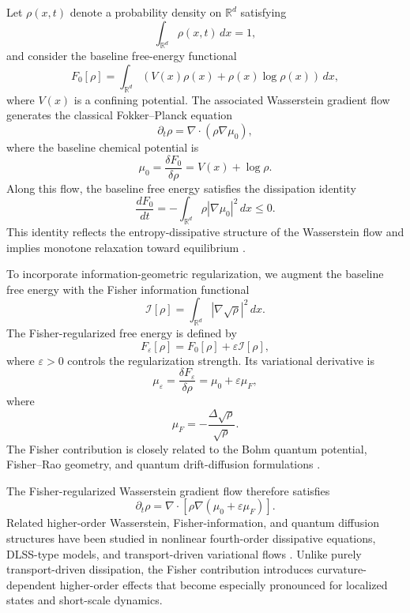 \documentclass[aps,prl,twocolumn,10pt,superscriptaddress]{revtex4-2}
\begin{document}
Let $\rho(x,t)$ denote a probability density on $\mathbb{R}^d$ satisfying
\[
\int_{\mathbb{R}^d}\rho(x,t)\,dx=1,
\]
and consider the baseline free-energy functional
\[
F_0[\rho]
=
\int_{\mathbb{R}^d}
\left(
V(x)\rho(x)
+
\rho(x)\log\rho(x)
\right)\,dx,
\]
where $V(x)$ is a confining potential. The associated Wasserstein gradient flow generates the classical Fokker--Planck equation
\cite{jordan1998variational,otto2001geometry,ambrosio2008gradient,carrillo2003kinetic}
\[
\partial_t\rho
=
\nabla\cdot
\left(
\rho\nabla\mu_0
\right),
\]
where the baseline chemical potential is
\[
\mu_0
=
\frac{\delta F_0}{\delta\rho}
=
V(x)+\log\rho .
\]
Along this flow, the baseline free energy satisfies the dissipation identity
\[
\frac{dF_0}{dt}
=
-
\int_{\mathbb{R}^d}
\rho |\nabla\mu_0|^2\,dx
\leq 0.
\]
This identity reflects the entropy-dissipative structure of the Wasserstein flow and implies monotone relaxation toward equilibrium
\cite{arnold2001convex,gianazza2009wasserstein}.

To incorporate information-geometric regularization, we augment the baseline free energy with the Fisher information functional
\[
\mathcal{I}[\rho]
=
\int_{\mathbb{R}^d}
|\nabla\sqrt{\rho}|^2\,dx .
\]
The Fisher-regularized free energy is defined by
\[
F_\varepsilon[\rho]
=
F_0[\rho]
+
\varepsilon \mathcal{I}[\rho],
\]
where $\varepsilon>0$ controls the regularization strength. Its variational derivative is
\[
\mu_\varepsilon
=
\frac{\delta F_\varepsilon}{\delta\rho}
=
\mu_0+\varepsilon\mu_F,
\]
where
\[
\mu_F
=
-
\frac{\Delta\sqrt{\rho}}{\sqrt{\rho}} .
\]
The Fisher contribution is closely related to the Bohm quantum potential, Fisher--Rao geometry, and quantum drift-diffusion formulations
\cite{jungel2009transport, bohm1952suggested,madelung1927quantentheorie,jungel2001quasi}.

The Fisher-regularized Wasserstein gradient flow therefore satisfies
\[
\partial_t\rho
=
\nabla\cdot
\left[
\rho\nabla
\left(
\mu_0+\varepsilon\mu_F
\right)
\right].
\]
Related higher-order Wasserstein, Fisher-information, and quantum diffusion structures have been studied in nonlinear fourth-order dissipative equations, DLSS-type models, and transport-driven variational flows
\cite{otto2001geometry,gianazza2009wasserstein,dolbeault2006logarithmic,jungel2009transport, matthes2009family,fischer2014infinite}.
Unlike purely transport-driven dissipation, the Fisher contribution introduces curvature-dependent higher-order effects that become especially pronounced for localized states and short-scale dynamics.
\end{document}

